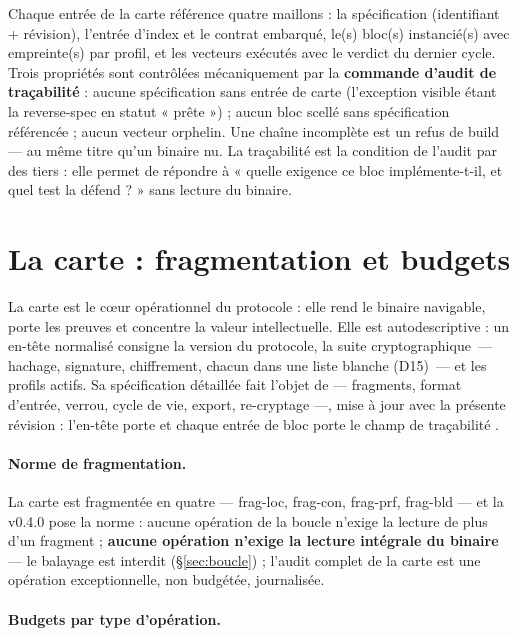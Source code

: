 Chaque entrée de la carte référence quatre maillons : la spécification (identifiant +
révision), l’entrée d’index et le contrat embarqué, le(s) bloc(s) instancié(s) avec
empreinte(s) par profil, et les vecteurs exécutés avec le verdict du dernier cycle. Trois
propriétés sont contrôlées mécaniquement par la \textbf{commande d’audit de traçabilité} :
aucune spécification sans entrée de carte (l’exception visible étant la reverse-spec en
statut « prête ») ; aucun bloc scellé sans spécification référencée ; aucun vecteur
orphelin. Une chaîne incomplète est un refus de build — au même titre qu’un binaire nu.
La traçabilité est la condition de l’audit par des tiers : elle permet de répondre à
« quelle exigence ce bloc implémente-t-il, et quel test la défend ? » sans lecture du
binaire.

\section{La carte : fragmentation et budgets}\label{sec:carte}

\begin{sloppypar}
La carte est le cœur opérationnel du protocole : elle rend le binaire navigable, porte les
preuves et concentre la valeur intellectuelle. Elle est autodescriptive : un en-tête
normalisé consigne la version du protocole, la suite cryptographique~— hachage, signature,
chiffrement, chacun dans une liste blanche (D15)~— et les profils actifs. Sa spécification
détaillée fait l’objet de  — fragments, format d’entrée, verrou,
cycle de vie, export, re-cryptage —, mise à jour avec la présente révision : l’en-tête
porte  et chaque entrée de bloc porte le champ de traçabilité
.
\end{sloppypar}

\paragraph{Norme de fragmentation.} La carte est fragmentée en quatre — frag-loc, frag-con,
frag-prf, frag-bld — et la v0.4.0 pose la norme : aucune opération de la boucle n’exige la
lecture de plus d’un fragment ; \textbf{aucune opération n’exige la lecture intégrale du
binaire} — le balayage est interdit (§\ref{sec:boucle}) ; l’audit complet de la carte est
une opération exceptionnelle, non budgétée, journalisée.

\paragraph{Budgets par type d’opération.}

